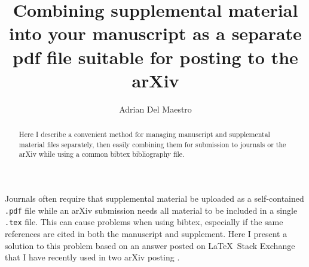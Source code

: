 \documentclass[10pt,twocolumn,prl,aps,floatfix,superscriptaddress,longbibliography]{revtex4-1}
\begin{document}
\title{Combining supplemental material into your manuscript as a separate pdf
file suitable for posting to the arXiv}

\author{Adrian Del Maestro}

\begin{abstract}
    Here I describe a convenient method for managing manuscript and supplemental
    material files separately, then easily combining them for submission to
    journals or the arXiv while using a common bibtex bibliography file.
\end{abstract}
\maketitle

Journals often require that supplemental material be uploaded as a
self-contained \texttt{.pdf} file while an arXiv submission needs all material to be
included in a single \texttt{.tex} file.  This can cause problems when using
bibtex, especially if the same references are cited in both the manuscript and supplement.
Here I present a solution to this problem based on an answer posted on
\LaTeX~Stack Exchange \cite{tex} that I have recently used in two arXiv
posting \cite{Sengupta:2017tl, Barghathi:2018rg}.
\end{document}
